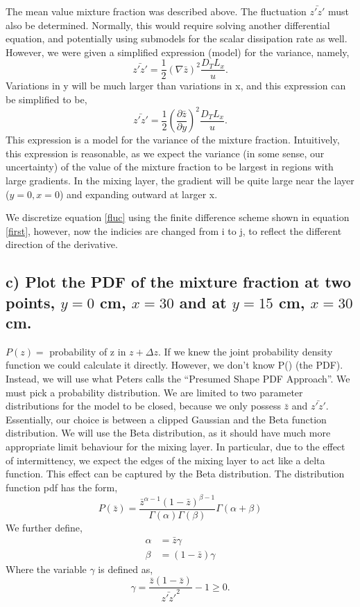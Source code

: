 \documentclass{article}
\begin{document}
The mean value mixture fraction was described above. The fluctuation $\bar{z'z'}$
must also be determined. Normally, this would require solving another differential equation, 
and potentially using submodels for the scalar dissipation rate as well. However, we were given a
simplified expression (model) for the variance, namely,
\begin{equation}
 \bar{z'z'} = \frac{1}{2} (\nabla \bar z)^2 \frac{D_T L_x}{u}. 
\end{equation}
Variations in y will be much larger than variations in x, and this expression 
can be simplified to be,
\begin{equation}
 \bar{z'z'} = \frac{1}{2} (\frac{\partial \bar z}{\partial y})^2 \frac{D_T L_x}{u}. 
 \label{fluc}
\end{equation}
This expression is a model for the variance of the mixture fraction. Intuitively, this expression is reasonable, 
as we expect the variance (in some sense, our uncertainty) of the value of the mixture fraction to be largest in regions 
with large gradients. In the mixing layer, the gradient will be quite large near the layer ($y=0,x=0$) and expanding outward 
at larger x. 

We discretize equation \ref{fluc} using the finite difference scheme shown in equation \ref{first}, however, 
now the indicies are changed from i to j, to reflect the different direction of the derivative.
%
%
%
%
\subsection*{c) Plot the PDF of the mixture fraction at two points, $y=0$ cm,
$x=30$ and at $y=15$ cm, $x=30$ cm.}

$P(z) =$ probability of z in $z+\Delta z$. If we knew the joint probability density function
we could calculate it directly. However, we don't know P() (the PDF). Instead, we will use 
what Peters calls the ``Presumed Shape PDF Approach''. We must pick a probability distribution. 
We are limited to two parameter distributions for the model to be closed, because we only possess 
$\bar z$ and $\bar{z'z'}$. Essentially, our choice is between a clipped Gaussian and the Beta 
function distribution. We will use the Beta distribution, as it should have much more appropriate 
limit behaviour for the mixing layer. In particular, due to the effect of intermittency, we expect the 
edges of the mixing layer to act like a delta function. This effect can be captured by the Beta distribution. 
The distribution function pdf has the form, 
\begin{equation}
P(\bar z) = \frac{\bar z^{\alpha-1}(1-\bar z)^{\beta-1}}{\Gamma(\alpha)\Gamma(\beta)}\Gamma(\alpha + \beta)
\end{equation}
We further define,
\begin{align}
\alpha &= \bar z \gamma \\
\beta  &= (1-\bar z) \gamma
\end{align}
Where the variable $\gamma$ is defined as, 
\begin{equation}
  \gamma = \frac{\bar z (1-\bar z)}{\bar{z'z'}^2} -1 \geq 0.
\end{equation}
%
%
%
%
\end{document}
